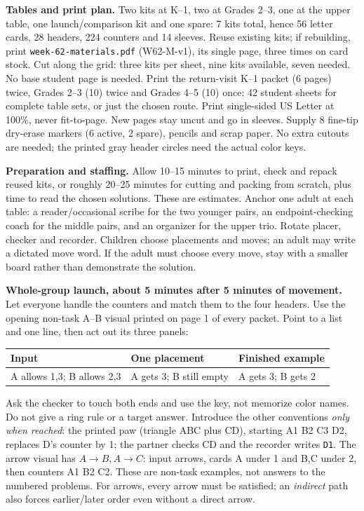\documentclass[10pt]{article}
\newcommand{\word}[1]{\texttt{#1}}
\begin{document}
\textbf{Tables and print plan.} Two kits at K--1, two at Grades 2--3, one at the upper table, one launch/comparison kit and one spare: 7 kits total, hence 56 letter cards, 28 headers, 224 counters and 14 sleeves. Reuse existing kits; if rebuilding, print \word{week-62-materials.pdf} (W62-M-v1), its single page, three times on card stock. Cut along the grid: three kits per sheet, nine kits available, seven needed. No base student page is needed. Print the return-visit K--1 packet (6 pages) twice, Grades 2--3 (10) twice and Grades 4--5 (10) once: 42 student sheets for complete table sets, or just the chosen route. Print single-sided US Letter at 100\%, never fit-to-page. New pages stay uncut and go in sleeves. Supply 8 fine-tip dry-erase markers (6 active, 2 spare), pencils and scrap paper. No extra cutouts are needed; the printed gray header circles need the actual color keys.

\textbf{Preparation and staffing.} Allow 10--15 minutes to print, check and repack reused kits, or roughly 20--25 minutes for cutting and packing from scratch, plus time to read the chosen solutions. These are estimates. Anchor one adult at each table: a reader/occasional scribe for the two younger pairs, an endpoint-checking coach for the middle pairs, and an organizer for the upper trio. Rotate placer, checker and recorder. Children choose placements and moves; an adult may write a dictated move word. If the adult must choose every move, stay with a smaller board rather than demonstrate the solution.

\textbf{Whole-group launch, about 5 minutes after 5 minutes of movement.} Let everyone handle the counters and match them to the four headers. Use the opening non-task A--B visual printed on page 1 of every packet. Point to a list and one line, then act out its three panels:
\begin{center}
\begin{tabular}{lll}
Input & One placement & Finished example\\\midrule
A allows 1,3; B allows 2,3 & A gets 3; B still empty & A gets 3; B gets 2\\
\end{tabular}
\end{center}
Ask the checker to touch both ends and use the key, not memorize color names. Do not give a ring rule or a target answer. Introduce the other conventions \emph{only when reached}: the printed paw (triangle ABC plus CD), starting A1 B2 C3 D2, replaces D's counter by 1; the partner checks CD and the recorder writes \word{D1}. The arrow visual has $A\to B,A\to C$: input arrows, cards A under 1 and B,C under 2, then counters A1 B2 C2. These are non-task examples, not answers to the numbered problems. For arrows, every arrow must be satisfied; an \emph{indirect} path also forces earlier/later order even without a direct arrow.
\end{document}
